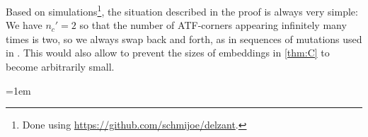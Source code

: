 \documentclass[AIF,Unicode,manuscript]{cedram}
\begin{document}
\begin{remark}
  \label{rem:possible_uniform_lower_bound}
    Based on simulations\footnote{Done using \url{https://github.com/schmijoe/delzant}.}, the situation described in the proof is always very simple: 
    We have $n_c'=2$ so that the number of ATF-corners appearing infinitely many times is two, so we always swap back and forth, as in sequences of mutations used in \cite{EvaUrz21}.
    This would also allow to prevent the sizes of embeddings in \cref{thm:C} to become arbitrarily small.
\end{remark}

\emergencystretch=1em

\end{document}
